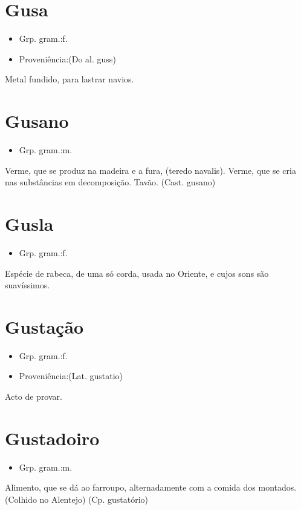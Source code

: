 \section{Gusa}
\begin{itemize}
\item {Grp. gram.:f.}
\end{itemize}
\begin{itemize}
\item {Proveniência:(Do al. \textunderscore guss\textunderscore )}
\end{itemize}
Metal fundido, para lastrar navios.
\section{Gusano}
\begin{itemize}
\item {Grp. gram.:m.}
\end{itemize}
Verme, que se produz na madeira e a fura, (\textunderscore teredo navalis\textunderscore ).
Verme, que se cria nas substâncias em decomposição.
Tavão.
(Cast. \textunderscore gusano\textunderscore )
\section{Gusla}
\begin{itemize}
\item {Grp. gram.:f.}
\end{itemize}
Espécie de rabeca, de uma só corda, usada no Oriente, e cujos sons são suavíssimos.
\section{Gustação}
\begin{itemize}
\item {Grp. gram.:f.}
\end{itemize}
\begin{itemize}
\item {Proveniência:(Lat. \textunderscore gustatio\textunderscore )}
\end{itemize}
Acto de provar.
\section{Gustadoiro}
\begin{itemize}
\item {Grp. gram.:m.}
\end{itemize}
Alimento, que se dá ao farroupo, alternadamente com a comida dos montados. (Colhido no Alentejo)
(Cp. \textunderscore gustatório\textunderscore )

